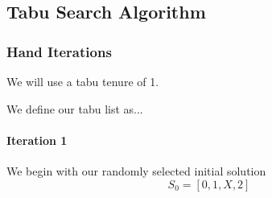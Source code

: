 \documentclass[a4paper]{article}
\newcommand{\subsubsubsection}[1]{\paragraph{#1} \mbox{}}
\begin{document}







\subsection{Tabu Search Algorithm} %

\subsubsection{Hand Iterations}

We will use a tabu tenure of 1.

We define our tabu list as...

\subsubsubsection{Iteration 1}

We begin with our randomly selected initial solution
$$S_0 = [ 0, 1, X, 2 ]$$
\end{document}
